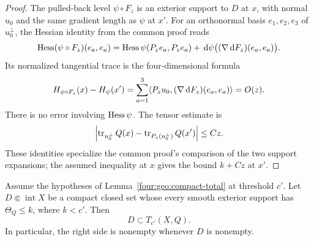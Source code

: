 \begin{proof}
The pulled-back level $\psi\circ F_z$ is an exterior support to $D$
at $x$, with normal $u_0$ and the same gradient length as $\psi$ at $x'$.
For an orthonormal basis $e_1,e_2,e_3$ of $u_0^\perp$, the Hessian
identity from the common proof reads
\[
 \operatorname{Hess}(\psi\circ F_z)(e_a,e_a)
 =\operatorname{Hess}\psi(P_ze_a,P_ze_a)
   +\,\mathrm d\psi\bigl((\nabla\,\mathrm d F_z)(e_a,e_a)\bigr).
\]
Its normalized tangential trace is the four-dimensional formula
\begin{equation}\label{four:geo:mean-curvature-transport}
 H_{\psi\circ F_z}(x)-H_\psi(x')
 =\sum_{a=1}^3
   \langle P_zu_0,(\nabla\,\mathrm d F_z)(e_a,e_a)\rangle=O(z).
\end{equation}
There is no error involving $\operatorname{Hess}\psi$.  The tensor estimate is
\[
 \left|\operatorname{tr}_{u_0^\perp}Q(x)
       -\operatorname{tr}_{P_z(u_0^\perp)}Q(x')\right|\le Cz.
\]
These identities specialize the common proof's comparison of the two
support expansions; the assumed inequality at $x$ gives the bound
$k+Cz$ at $x'$.
\end{proof}

\begin{lemma}\label{four:lem:support-enclosure}
Assume the hypotheses of Lemma~\ref{four:geo:compact-total} at threshold $c'$.
Let $D\Subset\operatorname{int}X$ be a compact closed set whose every
smooth exterior support has $\Theta_Q\le k$, where $k<c'$.  Then
\[
 D\subset T_{c'}(X,Q).
\]
In particular, the right side is nonempty whenever $D$ is nonempty.
\end{lemma}

